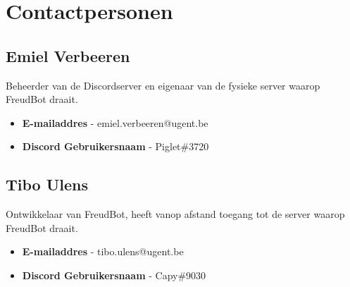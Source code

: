 \documentclass[12pt, a4paper]{article}
\begin{document}
	\section{Contactpersonen} \label{contactpersonen}
	\subsection{Emiel Verbeeren}
	Beheerder van de Discordserver en eigenaar van de fysieke server waarop
	FreudBot draait.

	\begin{itemize}
		\setlength{\itemsep}{0cm}
		\setlength{\parskip}{0cm}

		\item \textbf{E-mailaddres} - emiel.verbeeren@ugent.be
		\item \textbf{Discord Gebruikersnaam} - Piglet\#3720
	\end{itemize}

	\subsection{Tibo Ulens}
	Ontwikkelaar van FreudBot, heeft vanop afstand toegang tot de server waarop
	FreudBot draait.

	\begin{itemize}
		\setlength{\itemsep}{0cm}
		\setlength{\parskip}{0cm}

		\item \textbf{E-mailaddres} - tibo.ulens@ugent.be
		\item \textbf{Discord Gebruikersnaam} - Capy\#9030
	\end{itemize}
\end{document}
